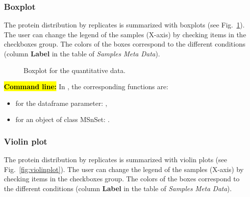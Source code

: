 \documentclass[12pt]{article}
\begin{document}
\subsubsection {Boxplot}\label{sec:boxplot}

The protein distribution by replicates is summarized with boxplots 
(see Fig.~\ref{fig:boxplot}). The user can change the legend of the samples 
(X-axis) by checking items in the checkboxes group. The colors of the boxes 
correspond to the different conditions (column \textbf{Label} in the table of 
\emph {Samples Meta Data}).

\begin {figure}
\centering
{}
\caption{Boxplot for the quantitative data.}\label{fig:boxplot}
\end {figure}



\hl{\bf Command line:} In , the corresponding functions are:
\begin{itemize}
\item for the dataframe parameter: ,
\item for an object of class MSnSet: .
\end{itemize}



\subsubsection {Violin plot}\label{sec:violinplot}

The protein distribution by replicates is summarized with violin plots 
(see Fig.~\ref{fig:violinplot}). The user can change the legend of the samples 
(X-axis) by checking items in the checkboxes group. The colors of the boxes 
correspond to the different conditions (column \textbf{Label} in the table of 
\emph {Samples Meta Data}).
\end{document}
